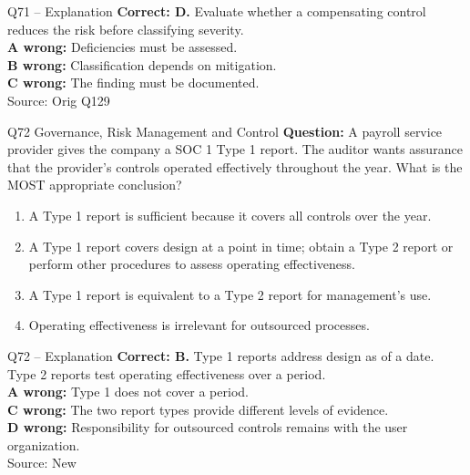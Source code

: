 \documentclass[aspectratio=169,10pt]{beamer}
\begin{document}
\begin{frame}[t]{Q71 -- Explanation}
	\footnotesize
	\textbf{Correct: D.} Evaluate whether a compensating control reduces the risk before classifying severity. \\[5pt]
\textbf{A wrong:} Deficiencies must be assessed. \\[3pt]
\textbf{B wrong:} Classification depends on mitigation. \\[3pt]
\textbf{C wrong:} The finding must be documented. \\[3pt]
	\vfill {\tiny Source: Orig Q129}
\end{frame}

\begin{frame}[t]{Q72 \hfill {\scriptsize Governance, Risk Management and Control}}
	\small
	\textbf{Question:} A payroll service provider gives the company a SOC 1 Type 1 report. The auditor wants assurance that the provider's controls operated effectively throughout the year. What is the MOST appropriate conclusion?
	\begin{enumerate}[label=\Alph*.,itemsep=1pt,topsep=3pt]
			\item A Type 1 report is sufficient because it covers all controls over the year.
			\item A Type 1 report covers design at a point in time; obtain a Type 2 report or perform other procedures to assess operating effectiveness.
			\item A Type 1 report is equivalent to a Type 2 report for management's use.
			\item Operating effectiveness is irrelevant for outsourced processes.
	\end{enumerate}
\end{frame}

\begin{frame}[t]{Q72 -- Explanation}
	\footnotesize
	\textbf{Correct: B.} Type 1 reports address design as of a date. Type 2 reports test operating effectiveness over a period. \\[5pt]
\textbf{A wrong:} Type 1 does not cover a period. \\[3pt]
\textbf{C wrong:} The two report types provide different levels of evidence. \\[3pt]
\textbf{D wrong:} Responsibility for outsourced controls remains with the user organization. \\[3pt]
	\vfill {\tiny Source: New}
\end{frame}
\end{document}
